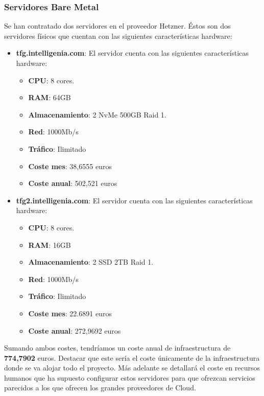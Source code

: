 		\subsubsection{Servidores Bare Metal}
			\begin{paragraph}
				Se han contratado dos servidores en el proveedor Hetzner. Éstos son dos servidores físicos que cuentan con las siguientes características hardware:
				
				\begin{itemize}
					\item \textbf{tfg.intelligenia.com}: El servidor cuenta con las siguientes características hardware:
					
					\begin{itemize}
						\item \textbf{CPU}: 8 cores.
						\item \textbf{RAM}: 64GB 
						\item \textbf{Almacenamiento}: 2 NvMe 500GB Raid 1.
						\item \textbf{Red}: 1000Mb/s
						\item \textbf{Tráfico}: Ilimitado
						\item \textbf{Coste mes}: 38,6555 euros
						\item \textbf{Coste anual}: 502,521 euros
					\end{itemize}
				
					\item \textbf{tfg2.intelligenia.com}: El servidor cuenta con las siguientes características hardware:
					
					\begin{itemize}
						\item \textbf{CPU}: 8 cores.
						\item \textbf{RAM}: 16GB 
						\item \textbf{Almacenamiento}: 2 SSD 2TB Raid 1.
						\item \textbf{Red}: 1000Mb/s
						\item \textbf{Tráfico}: Ilimitado
						\item \textbf{Coste mes}: 22.6891 euros
						\item \textbf{Coste anual}: 272,9692 euros
					\end{itemize}
				\end{itemize}
			
			Sumando ambos costes, tendríamos un coste anual de infraestructura de \textbf{774,7902} euros. Destacar que este sería el coste únicamente de la infraestructura donde se va alojar todo el proyecto. Más adelante se detallará el coste en recursos humanos que ha supuesto configurar estos servidores para que ofrezcan servicios parecidos a los que ofrecen los grandes proveedores de Cloud.
			
			\end{paragraph}
